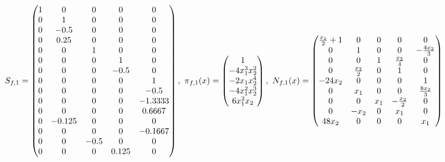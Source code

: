 \documentclass[fleqn]{article}
\begin{document}
\begin{align}
    S_{f,1} = \pmqty{ 1 & 0 & 0 & 0 & 0 \\ 0 & 1 & 0 & 0 & 0 \\ 0 & -0.5 & 0 & 0 & 0 \\ 0 & 0.25 & 0 & 0 & 0 \\ 0 & 0 & 1 & 0 & 0 \\ 0 & 0 & 0 & 1 & 0 \\ 0 & 0 & 0 & -0.5 & 0 \\ 0 & 0 & 0 & 0 & 1 \\ 0 & 0 & 0 & 0 & -0.5 \\ 0 & 0 & 0 & 0 & -1.3333 \\ 0 & 0 & 0 & 0 & 0.6667 \\ 0 & -0.125 & 0 & 0 & 0 \\ 0 & 0 & 0 & 0 & -0.1667 \\ 0 & 0 & -0.5 & 0 & 0 \\ 0 & 0 & 0 & 0.125 & 0 }
    ,~
    \pi_{f,1}(x) = \pmqty{
        1                \\
        -4x_{1}^3x_{2}^2 \\
        -2x_{1}x_{2}^4   \\
        -4x_{1}^2x_{2}^3 \\
        6x_{1}^2x_{2}    \\
    }
    ,~
    N_{f,1}(x) = \pmqty{
        \frac{x_{1}}{2}+1 & 0               & 0     & 0                & 0                 \\
        0                 & 1               & 0     & 0                & -\frac{4x_{2}}{3} \\
        0                 & 0               & 1     & \frac{x_{2}}{4}  & 0                 \\
        0                 & \frac{x_{2}}{2} & 0     & 1                & 0                 \\
        -24x_{2}          & 0               & 0     & 0                & 1                 \\
        0                 & x_{1}           & 0     & 0                & \frac{8x_{2}}{3}  \\
        0                 & 0               & x_{1} & -\frac{x_{2}}{2} & 0                 \\
        0                 & -x_{2}          & 0     & x_{1}            & 0                 \\
        48x_{2}           & 0               & 0     & 0                & x_{1}             \\
    }
\end{align}
\end{document}
